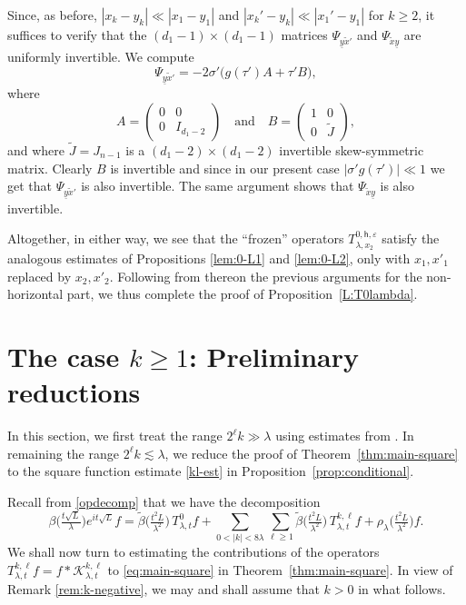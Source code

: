 \documentclass[leqno]{amsart}
\theoremstyle{definition}
\theoremstyle{remark}
\numberwithin{equation}{section}
\newcommand\la{{\lambda}}
\newcommand\sK{{\mathscr {K}}}
\begin{document}
Since, as before, $|x_k-y_k|\ll|x_1-y_1|$ and $|x_k'-y_k|\ll|x_1'-y_1|$ for $k\geq 2$, it suffices to verify that the $(d_1-1)\times (d_1-1)$ matrices $\Psi_{\underline y\tilde x'}$ and $\Psi_{\tilde x \underline y}$ are uniformly invertible.
We compute 
\[
\Psi_{\underline y\tilde x'} = -2\sigma'\big( g(\tau') A + \tau' B\big),
\]
where
\[
A = \begin{pmatrix} 0&0\\0&I_{d_1-2}\end{pmatrix}
\quad\text{and}\quad
B= \begin{pmatrix} 1&0\\0& \tilde J \end{pmatrix},
\]
and where $\tilde J=J_{n-1}$ is a $(d_1-2)\times (d_1-2)$ invertible skew-symmetric matrix. Clearly $B$ is invertible and since in our present case $|\sigma'g(\tau')|\ll 1$ we get that $\Psi_{\underline y\tilde x'} $ is also invertible. The same argument shows that $\Psi_{ \tilde x \underline y }$ is also invertible. 

Altogether, in either way, we see that the ``frozen'' operators $T_{\lambda,x_2}^{0,\mathsf{h},\varepsilon}$ satisfy the analogous estimates of Propositions \ref{lem:0-L1} and \ref{lem:0-L2}, only with $x_1, x'_1$ replaced by  $x_2, x'_2$. Following from thereon the previous arguments for the non-horizontal part, we thus complete the proof of Proposition~\ref{L:T0lambda}.

\section{The case $k\ge 1$: Preliminary reductions}\label{sec:kneq0-preliminaries}

In this section, we first treat the range $2^\ell k\gg\lambda$ using estimates from \cite{MuellerSeeger2015}. In remaining the range $2^\ell k\lesssim \lambda$, we reduce the proof of Theorem~\ref{thm:main-square} to the square function estimate \eqref{kl-est} in Proposition~\ref{prop:conditional}.

Recall from \eqref{opdecomp} that we have the decomposition 
\[
\beta\big(\tfrac{t\sqrt L}{\la}\big) e^{it\sqrt L }f
= \widetilde \beta\big(\tfrac{t^2L}{\la^2}) \, T^0_{\la,t} f
+ \sum_{0<|k|<8\la } \sum_{\ell\ge 1} \widetilde \beta\big(\tfrac{t^2L}{\la^2}) \, T^{k,\ell}_{\la,t}f+ \rho_\la\big(\tfrac{t^2L}{\la^2}\big)f.
\]
We shall now turn to  estimating the contributions  of the operators  $T^{k,\ell}_{\la,t}f=f*\sK^{k,\ell}_{\la,t}$ to \eqref{eq:main-square} in Theorem~\ref{thm:main-square}. In view of Remark \ref{rem:k-negative}, we may and shall assume that $k>0$ in what follows. 
\end{document}
